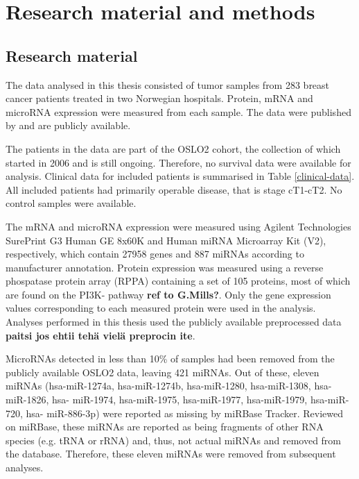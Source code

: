 


\section{Research material and methods}\label{material-and-methods}

\subsection{Research material}

The data analysed in this thesis consisted of tumor samples from 283 breast
cancer patients treated in two Norwegian hospitals. Protein, mRNA and microRNA
expression were measured from each sample. The data were published by
\citet{Aure2015} and are publicly available.

The patients in the data are part of the OSLO2 cohort, the collection of which
started in 2006 and is still ongoing. Therefore, no survival data were
available for analysis. Clinical data for included patients is summarised in
Table \ref{clinical-data}. All included patients had primarily operable
disease, that is stage cT1-cT2. No control samples were available.

The mRNA and microRNA expression were measured using Agilent Technologies
SurePrint G3 Human GE 8x60K and Human miRNA Microarray Kit (V2), respectively,
which contain 27958 genes and 887 miRNAs according to manufacturer annotation.
Protein expression was measured using a reverse phospatase protein array
(RPPA) containing a set of 105 proteins, most of which are found on the PI3K-
pathway \textbf{ref to G.Mills?}. Only the gene expression values
corresponding to each measured protein were used in the analysis. Analyses
performed in this thesis used the publicly available preprocessed data
\textbf{paitsi jos ehtii tehä vielä preprocin ite}.

MicroRNAs detected in less than 10\% of samples had been removed from the
publicly available OSLO2 data, leaving 421 miRNAs. Out of these, eleven miRNAs
(hsa-miR-1274a, hsa-miR-1274b, hsa-miR-1280, hsa-miR-1308, hsa- miR-1826, hsa-
miR-1974, hsa-miR-1975, hsa-miR-1977, hsa-miR-1979, hsa-miR-720, hsa-
miR-886-3p) were reported as missing by miRBase Tracker. Reviewed on miRBase,
these miRNAs are reported as being fragments of other RNA species (e.g. tRNA
or rRNA) and, thus, not actual miRNAs and removed from the database.
Therefore, these eleven miRNAs were removed from subsequent analyses.




